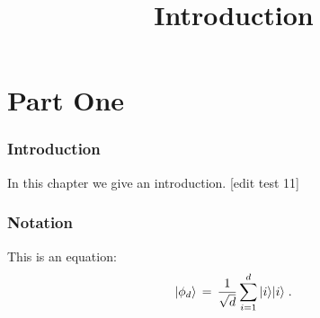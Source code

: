 

%


\title{Introduction}
\label{introduction}


\maketitle


\tableofcontents

\part{Part One}
\label{one}

\section{Introduction}
\label{section:introduction}

In this chapter we give an introduction. [edit test 11]

\section{Notation}
\label{section-notation}

This is an equation:
\begin{equation}
\label{eq:me-state}
 |\phi_d\rangle \,=\,\frac{1}{\sqrt{d}} \sum_{i=1}^d |i\rangle|i\rangle\;.
\end{equation}









